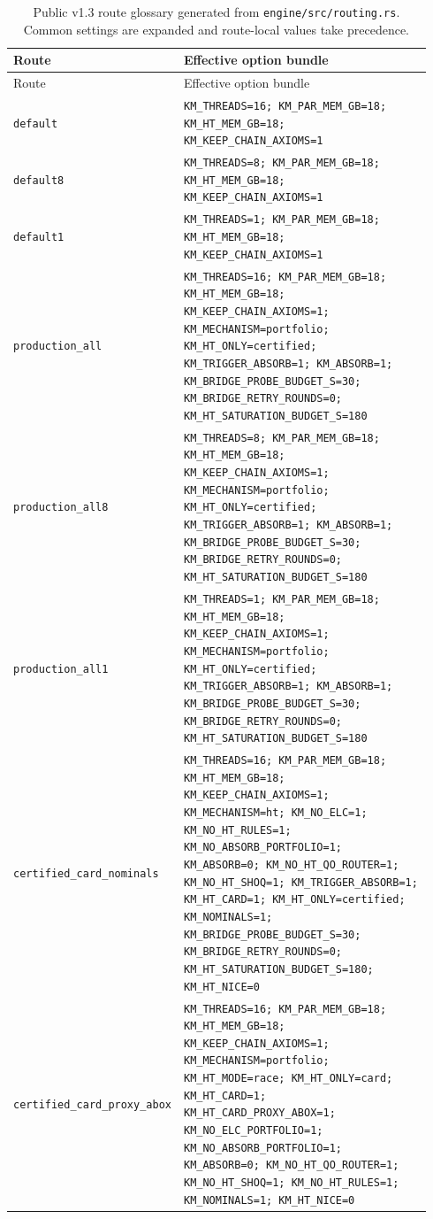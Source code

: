 \begin{longtable}{@{}p{0.18\linewidth}p{0.76\linewidth}@{}}
\caption{Public v1.3 route glossary generated from \texttt{engine/src/routing.rs}. Common settings are expanded and route-local values take precedence.}\label{tab:route-glossary}\\
\toprule
Route & Effective option bundle \\
\midrule
\endfirsthead
\toprule Route & Effective option bundle \\
\midrule
\endhead
\texttt{default} & \texttt{KM\_THREADS=16; KM\_PAR\_MEM\_GB=18; KM\_HT\_MEM\_GB=18; KM\_KEEP\_CHAIN\_AXIOMS=1} \\
\texttt{default8} & \texttt{KM\_THREADS=8; KM\_PAR\_MEM\_GB=18; KM\_HT\_MEM\_GB=18; KM\_KEEP\_CHAIN\_AXIOMS=1} \\
\texttt{default1} & \texttt{KM\_THREADS=1; KM\_PAR\_MEM\_GB=18; KM\_HT\_MEM\_GB=18; KM\_KEEP\_CHAIN\_AXIOMS=1} \\
\texttt{production\_all} & \texttt{KM\_THREADS=16; KM\_PAR\_MEM\_GB=18; KM\_HT\_MEM\_GB=18; KM\_KEEP\_CHAIN\_AXIOMS=1; KM\_MECHANISM=portfolio; KM\_HT\_ONLY=certified; KM\_TRIGGER\_ABSORB=1; KM\_ABSORB=1; KM\_BRIDGE\_PROBE\_BUDGET\_S=30; KM\_BRIDGE\_RETRY\_ROUNDS=0; KM\_HT\_SATURATION\_BUDGET\_S=180} \\
\texttt{production\_all8} & \texttt{KM\_THREADS=8; KM\_PAR\_MEM\_GB=18; KM\_HT\_MEM\_GB=18; KM\_KEEP\_CHAIN\_AXIOMS=1; KM\_MECHANISM=portfolio; KM\_HT\_ONLY=certified; KM\_TRIGGER\_ABSORB=1; KM\_ABSORB=1; KM\_BRIDGE\_PROBE\_BUDGET\_S=30; KM\_BRIDGE\_RETRY\_ROUNDS=0; KM\_HT\_SATURATION\_BUDGET\_S=180} \\
\texttt{production\_all1} & \texttt{KM\_THREADS=1; KM\_PAR\_MEM\_GB=18; KM\_HT\_MEM\_GB=18; KM\_KEEP\_CHAIN\_AXIOMS=1; KM\_MECHANISM=portfolio; KM\_HT\_ONLY=certified; KM\_TRIGGER\_ABSORB=1; KM\_ABSORB=1; KM\_BRIDGE\_PROBE\_BUDGET\_S=30; KM\_BRIDGE\_RETRY\_ROUNDS=0; KM\_HT\_SATURATION\_BUDGET\_S=180} \\
\texttt{certified\_card\_nominals} & \texttt{KM\_THREADS=16; KM\_PAR\_MEM\_GB=18; KM\_HT\_MEM\_GB=18; KM\_KEEP\_CHAIN\_AXIOMS=1; KM\_MECHANISM=ht; KM\_NO\_ELC=1; KM\_NO\_HT\_RULES=1; KM\_NO\_ABSORB\_PORTFOLIO=1; KM\_ABSORB=0; KM\_NO\_HT\_QO\_ROUTER=1; KM\_NO\_HT\_SHOQ=1; KM\_TRIGGER\_ABSORB=1; KM\_HT\_CARD=1; KM\_HT\_ONLY=certified; KM\_NOMINALS=1; KM\_BRIDGE\_PROBE\_BUDGET\_S=30; KM\_BRIDGE\_RETRY\_ROUNDS=0; KM\_HT\_SATURATION\_BUDGET\_S=180; KM\_HT\_NICE=0} \\
\texttt{certified\_card\_proxy\_abox} & \texttt{KM\_THREADS=16; KM\_PAR\_MEM\_GB=18; KM\_HT\_MEM\_GB=18; KM\_KEEP\_CHAIN\_AXIOMS=1; KM\_MECHANISM=portfolio; KM\_HT\_MODE=race; KM\_HT\_ONLY=card; KM\_HT\_CARD=1; KM\_HT\_CARD\_PROXY\_ABOX=1; KM\_NO\_ELC\_PORTFOLIO=1; KM\_NO\_ABSORB\_PORTFOLIO=1; KM\_ABSORB=0; KM\_NO\_HT\_QO\_ROUTER=1; KM\_NO\_HT\_SHOQ=1; KM\_NO\_HT\_RULES=1; KM\_NOMINALS=1; KM\_HT\_NICE=0} \\

\end{longtable}
